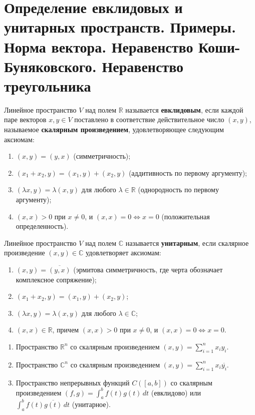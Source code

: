 \section{Определение евклидовых и унитарных пространств. Примеры. Норма вектора. Неравенство Коши-Буняковского. Неравенство треугольника}

\begin{definition}
Линейное пространство $V$ над полем $\mathbb{R}$ называется \textbf{евклидовым}, если каждой паре векторов $x, y \in V$ поставлено в соответствие действительное число $(x, y)$, называемое \textbf{скалярным произведением}, удовлетворяющее следующим аксиомам:
\begin{enumerate}
    \item $(x, y) = (y, x)$ (симметричность);
    \item $(x_1 + x_2, y) = (x_1, y) + (x_2, y)$ (аддитивность по первому аргументу);
    \item $(\lambda x, y) = \lambda (x, y)$ для любого $\lambda \in \mathbb{R}$ (однородность по первому аргументу);
    \item $(x, x) > 0$ при $x \neq 0$, и $(x, x) = 0 \iff x = 0$ (положительная определенность).
\end{enumerate}
\end{definition}

\begin{definition}
Линейное пространство $V$ над полем $\mathbb{C}$ называется \textbf{унитарным}, если скалярное произведение $(x, y) \in \mathbb{C}$ удовлетворяет аксиомам:
\begin{enumerate}
    \item $(x, y) = \overline{(y, x)}$ (эрмитова симметричность, где черта обозначает комплексное сопряжение);
    \item $(x_1 + x_2, y) = (x_1, y) + (x_2, y)$;
    \item $(\lambda x, y) = \lambda (x, y)$ для любого $\lambda \in \mathbb{C}$;
    \item $(x, x) \in \mathbb{R}$, причем $(x, x) > 0$ при $x \neq 0$, и $(x, x) = 0 \iff x = 0$.
\end{enumerate}
\end{definition}

\begin{example}[Примеры]
\begin{enumerate}
    \item Пространство $\mathbb{R}^n$ со скалярным произведением $(x, y) = \sum_{i=1}^n x_i y_i$.
    \item Пространство $\mathbb{C}^n$ со скалярным произведением $(x, y) = \sum_{i=1}^n x_i \overline{y_i}$.
    \item Пространство непрерывных функций $C([a, b])$ со скалярным произведением $(f, g) = \int_a^b f(t) g(t) \, dt$ (евклидово) или $\int_a^b f(t) \overline{g(t)} \, dt$ (унитарное).
\end{enumerate}
\end{example}

